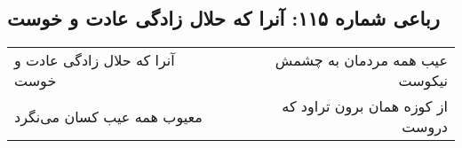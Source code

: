 \begin{center}
\section*{رباعی شماره ۱۱۵: آنرا که حلال زادگی عادت و خوست}
\label{sec:sh115}
\begin{longtable}{l p{0.5cm} r}
آنرا که حلال زادگی عادت و خوست
&&
عیب همه مردمان به چشمش نیکوست
\\
معیوب همه عیب کسان می‌نگرد
&&
از کوزه همان برون تراود که دروست
\\
\end{longtable}
\end{center}
